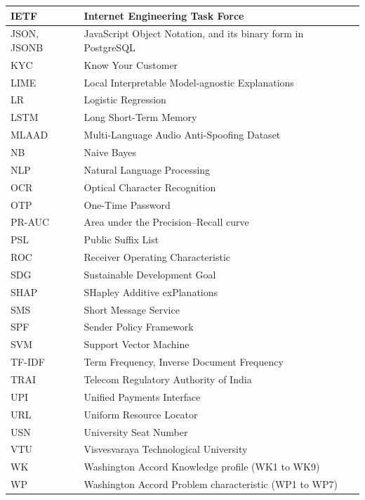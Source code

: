 {\begin{longtable}{|p{2.7cm}|p{11.5cm}|}
IETF & Internet Engineering Task Force \\ \hline
JSON, JSONB & JavaScript Object Notation, and its binary form in PostgreSQL \\ \hline
KYC & Know Your Customer \\ \hline
LIME & Local Interpretable Model-agnostic Explanations \\ \hline
LR & Logistic Regression \\ \hline
LSTM & Long Short-Term Memory \\ \hline
MLAAD & Multi-Language Audio Anti-Spoofing Dataset \\ \hline
NB & Naive Bayes \\ \hline
NLP & Natural Language Processing \\ \hline
OCR & Optical Character Recognition \\ \hline
OTP & One-Time Password \\ \hline
PR-AUC & Area under the Precision--Recall curve \\ \hline
PSL & Public Suffix List \\ \hline
ROC & Receiver Operating Characteristic \\ \hline
SDG & Sustainable Development Goal \\ \hline
SHAP & SHapley Additive exPlanations \\ \hline
SMS & Short Message Service \\ \hline
SPF & Sender Policy Framework \\ \hline
SVM & Support Vector Machine \\ \hline
TF-IDF & Term Frequency, Inverse Document Frequency \\ \hline
TRAI & Telecom Regulatory Authority of India \\ \hline
UPI & Unified Payments Interface \\ \hline
URL & Uniform Resource Locator \\ \hline
USN & University Seat Number \\ \hline
VTU & Visvesvaraya Technological University \\ \hline
WK & Washington Accord Knowledge profile (WK1 to WK9) \\ \hline
WP & Washington Accord Problem characteristic (WP1 to WP7) \\ \hline
\end{longtable}
}

